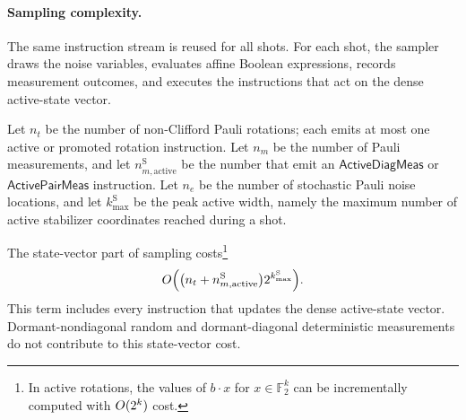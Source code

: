 \documentclass[a4paper,onecolumn,unpublished]{quantumarticle}
\DeclarePairedDelimiter\rbra{\lparen}{\rparen}
\newcommand{\iFont}[1]{\textsf{#1}}
\newcommand{\iActiveDiagMeas}{\iFont{ActiveDiagMeas}}
\newcommand{\iActivePairMeas}{\iFont{ActivePairMeas}}
\newcommand{\FF}{\mathbb{F}}
\begin{document}
\paragraph{Sampling complexity.}
The same instruction stream is reused for all shots.
For each shot, the sampler draws the noise variables, evaluates affine Boolean expressions, records measurement outcomes, and executes the instructions that act on the dense active-state vector.

Let $n_t$ be the number of non-Clifford Pauli rotations; each emits at most one active or promoted rotation instruction.
Let $n_m$ be the number of Pauli measurements, and let $n_{m,\mathrm{active}}^{\mathrm S}$ be the number that emit an $\iActiveDiagMeas$ or $\iActivePairMeas$ instruction.
Let $n_e$ be the number of stochastic Pauli noise locations, and let $k_{\max}^{\mathrm S}$ be the peak active width, namely the maximum number of active stabilizer coordinates reached during a shot.

The state-vector part of sampling costs\footnote{In active rotations, the values of $b\cdot x$ for $x\in\FF_2^k$ can be incrementally computed with $O\rbra{2^k}$ cost.}
\begin{equation*}
    O\rbra*{\rbra*{n_t+n_{m,\mathrm{active}}^{\mathrm S}}
    2^{k_{\max}^{\mathrm S}}}.
\end{equation*}
This term includes every instruction that updates the dense active-state vector.
Dormant-nondiagonal random and dormant-diagonal deterministic measurements do not contribute to this state-vector cost.
\end{document}
